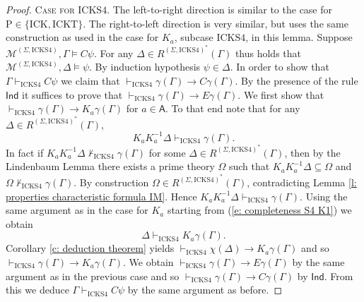 \documentclass[10pt,a4paper]{amsart}
\newcommand\A{\mathsf{A}}
\newcommand\C {C}
\newcommand{\E}{E}
\newcommand{\K}{K}
\newcommand{\agi}{a}
\newcommand{\fw}{\mathcal{M}}
\newcommand{\hick}{\mathrm{ICK}}
\newcommand{\hickp}{\mathrm{P}}
\newcommand{\hicks}{\mathrm{ICKS4}}
\newcommand{\hickt}{\mathrm{ICKT}}
\begin{document}
\begin{proof}
   \noindent \textsc{Case for $\hicks$.} The left-to-right direction is similar to the case for $\hickp \in \{\hick, \hickt\}$. The right-to-left direction is very similar, but uses the same construction as used in the case for $\K_\agi$, subcase $\hicks$, in this lemma. Suppose $\fw^{(\Sigma, \hicks)}, \Gamma \models \C \psi$. For any $\Delta \in R^{(\Sigma, \hicks)^*}(\Gamma)$ thus holds that $\fw^{(\Sigma, \hicks)}, \Delta \models \psi$. By induction hypothesis $\psi \in \Delta$. In order to show that $\Gamma \vdash_\hicks \C \psi$ we claim that $\vdash_\hicks \gamma(\Gamma) \rightarrow \C \gamma(\Gamma)$. By the presence of the rule $\mathsf{Ind}$ it suffices to prove that $\vdash_\hicks \gamma(\Gamma) \rightarrow \E \gamma(\Gamma)$. We first show that $\vdash_\hicks \gamma(\Gamma) \rightarrow \K_\agi \gamma(\Gamma)$ for $\agi \in \A$. To that end note that for any $\Delta \in R^{(\Sigma, \hicks)^*}(\Gamma)$,
 \begin{equation*}
     \K_\agi \K_\agi^{-1} \Delta \vdash_\hicks \gamma(\Gamma).
 \end{equation*}
 In fact if $\K_\agi \K_\agi^{-1} \Delta \not \vdash_\hicks \gamma(\Gamma)$ for some $\Delta \in R^{(\Sigma, \hicks)^*}(\Gamma)$, then by the Lindenbaum Lemma there exists a prime theory $\Omega$ such that $\K_\agi \K_\agi^{-1} \Delta \subseteq \Omega$ and $\Omega \not \vdash_\hicks \gamma(\Gamma)$. By construction $\Omega \in R^{(\Sigma, \hicks)^*}(\Gamma)$, contradicting Lemma \ref{l: properties characteristic formula IM}. Hence $ \K_\agi \K_\agi^{-1} \Delta \vdash_\hicks \gamma(\Gamma)$. Using the same argument as in the case for $\K_\agi$ starting from (\ref{e: completeness S4 K1}) we obtain
 \begin{equation*}\label{e: completeness S4 C1}
     \Delta \vdash_\hicks \K_\agi \gamma(\Gamma).
 \end{equation*}
 Corollary \ref{c: deduction theorem} yields $\vdash_\hicks \chi(\Delta) \rightarrow \K_\agi \gamma(\Gamma)$ and so $\vdash_\hicks \gamma(\Gamma) \rightarrow \K_\agi \gamma(\Gamma)$. We obtain $\vdash_\hicks \gamma(\Gamma) \rightarrow \E \gamma(\Gamma)$ by the same argument as in the previous case and so $\vdash_\hicks \gamma(\Gamma) \rightarrow \C \gamma(\Gamma)$ by $\mathsf{Ind}$. From this we deduce $\Gamma \vdash_\hicks \C \psi$ by the same argument as before. \smallskip


\end{proof}
\end{document}
